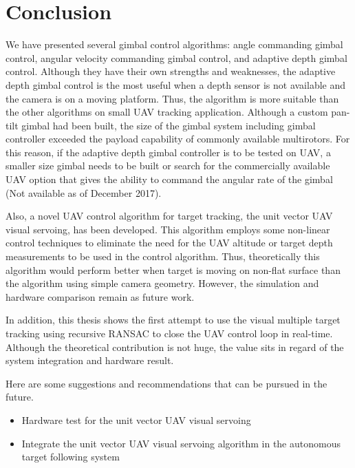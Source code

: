 \chapter{Conclusion}
\label{chapter5}
We have presented several gimbal control algorithms: angle commanding gimbal control, angular velocity commanding gimbal control, and adaptive depth gimbal control. Although they have their own strengths and weaknesses, the adaptive depth gimbal control is the most useful when a depth sensor is not available and the camera is on a moving platform. Thus, the algorithm is more suitable than the other algorithms on small UAV tracking application. Although a custom pan-tilt gimbal had been built, the size of the gimbal system including gimbal controller exceeded the payload capability of commonly available multirotors. For this reason, if the adaptive depth gimbal controller is to be tested on UAV, a smaller size gimbal needs to be built or search for the commercially available UAV option that gives the ability to command the angular rate of the gimbal (Not available as of December 2017). 

Also, a novel UAV control algorithm for target tracking, the unit vector UAV visual servoing, has been developed. This algorithm employs some non-linear control techniques to eliminate the need for the UAV altitude or target depth measurements to be used in the control algorithm. Thus, theoretically this algorithm would perform better when target is moving on non-flat surface than the algorithm using simple camera geometry. However, the simulation and hardware comparison remain as future work.

In addition, this thesis shows the first attempt to use the visual multiple target tracking using recursive RANSAC to close the UAV control loop in real-time. Although the theoretical contribution is not huge, the value sits in regard of the system integration and hardware result.

Here are some suggestions and recommendations that can be pursued in the future.
\begin{itemize}
	\item Hardware test for the unit vector UAV visual servoing
	\item Integrate the unit vector UAV visual servoing algorithm in the autonomous target following system
\end{itemize}
